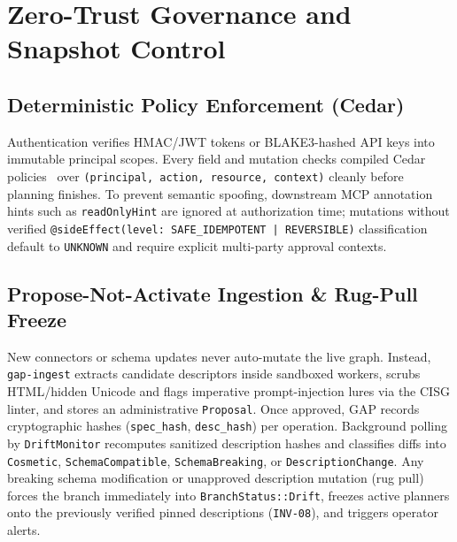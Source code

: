 \documentclass[10pt,twocolumn]{article}
\begin{document}
\section{Zero-Trust Governance and Snapshot Control}
\label{sec:sec}

\subsection{Deterministic Policy Enforcement (Cedar)}
Authentication verifies HMAC/JWT tokens or BLAKE3-hashed API keys into immutable principal scopes. Every field and mutation checks compiled Cedar policies~\cite{cutler2024cedar} over \texttt{(principal, action, resource, context)} cleanly before planning finishes. To prevent semantic spoofing, downstream MCP annotation hints such as \texttt{readOnlyHint} are ignored at authorization time; mutations without verified \texttt{@sideEffect(level: SAFE\_IDEMPOTENT | REVERSIBLE)} classification default to \texttt{UNKNOWN} and require explicit multi-party approval contexts.

\subsection{Propose-Not-Activate Ingestion \& Rug-Pull Freeze}
New connectors or schema updates never auto-mutate the live graph. Instead, \texttt{gap-ingest} extracts candidate descriptors inside sandboxed workers, scrubs HTML/hidden Unicode and flags imperative prompt-injection lures via the CISG linter, and stores an administrative \texttt{Proposal}. Once approved, GAP records cryptographic hashes (\texttt{spec\_hash}, \texttt{desc\_hash}) per operation. Background polling by \texttt{DriftMonitor} recomputes sanitized description hashes and classifies diffs into \texttt{Cosmetic}, \texttt{SchemaCompatible}, \texttt{SchemaBreaking}, or \texttt{DescriptionChange}. Any breaking schema modification or unapproved description mutation (rug pull) forces the branch immediately into \texttt{BranchStatus::Drift}, freezes active planners onto the previously verified pinned descriptions (\texttt{INV-08}), and triggers operator alerts.
\end{document}

